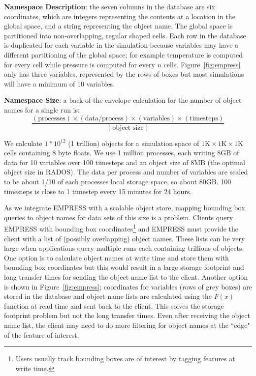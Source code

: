 \textbf{Namespace Description}: the seven columns in the database are six
coordinates, which are integers representing the contents at a location in the
global space, and a string representing the object name. The global space is
partitioned into non-overlapping, regular shaped cells.  Each row in the
database is duplicated for each variable in the simulation because variables
may have a different partitioning of the global space; for example temperature
is computed for every cell while pressure is computed for every \(n\) cells.
Figure~\ref{fig:empress} only has three variables, represented by the rows of
boxes but most simulations will have a minimum of 10 variables.

\textbf{Namespace Size}: a back-of-the-envelope calculation for the number of
object names for a single run is:
\[\frac
  {(\text{processes})\times
   (\text{data/process})\times
   (\text{variables})\times
   (\text{timesteps})}
  {(\text{object size})}
\]

We calculate \(1*10^{12}\) (1 trillion) objects for a simulation space of
\(1\text{K}\times1\text{K}\times1\text{K}\) cells containing 8 byte floats.  We
use 1 million processes, each writing 8GB of data for 10 variables over 100
timesteps and an object size of 8MB (the optimal object size in RADOS).
The data per process and number of variables are scaled to be about
1/10 of each processes local storage space, so about 80GB. 100 timesteps is
close to 1 timestep every 15 minutes for 24 hours. 

As we integrate EMPRESS with a scalable object store, mapping bounding box
queries to object names for data sets of this size is a problem. Clients query
EMPRESS with bounding box coordinates\footnote{Users usually track bounding
boxes are of interest by tagging features at write time.} and EMPRESS must
provide the client with a list of (possibly overlapping) object names.  These
lists can be very large when applications query multiple runs each containing
trillions of objects.  One option is to calculate object names at write time
and store them with bounding box coordinates but this would result in a large
storage footprint and long transfer times for sending the object name list to
the client.  Another option is shown in Figure~\ref{fig:empress}; coordinates
for variables (rows of grey boxes) are stored in the database and object name
lists are calculated using the \(F(x)\) function at read time and sent back to
the client. This solves the storage footprint problem but not the long transfer
times.  Even after receiving the object name list, the client may need to do
more filtering for object names at the ``edge" of the feature of interest.

